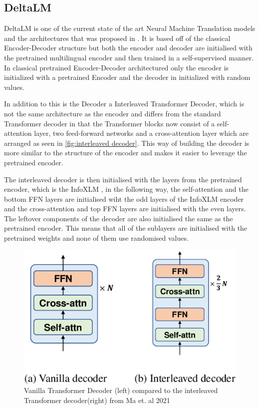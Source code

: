 \subsection{DeltaLM}
DeltaLM is one of the current state of the art Neural Machine Translation models and the architectures that was proposed in \cite{ma2021deltalm}. 
It is based off of the classical Encoder-Decoder structure but both the encoder and decoder are initialised with the pretrained multilingual encoder and then trained in a self-supervised manner. In classical pretrained Encoder-Decoder architectured only the encoder is initialized with a pretrained Encoder and the decoder in initialized with random values.

In addition to this is the Decoder a Interleaved Transformer Decoder, which is not the same architecture as the encoder and differs from the standard Transformer decoder in that the Transformer blocks now consist of a self-attention layer, two feed-forward networks and a cross-attention layer which are arranged as seen in \autoref{fig:interleaved decoder}. 
This way of building the decoder is more similar to the structure of the encoder and makes it easier to leverage the pretrained encoder. 

The interleaved decoder is then initialised with the layers from the pretrained encoder, which is the InfoXLM \cite{chi2021infoxlminformationtheoreticframeworkcrosslingual}, in the following way, the self-attention and the bottom FFN layers are initialised wiht the odd layers of the InfoXLM encoder and the cross-attention and top FFN layers are initialised with the even layers. 
The leftover components of the decoder are also initialised the same as the pretrained encoder. 
This means that all of the sublayers are initialised with the pretrained weights and none of them use randomised values. 

\begin{figure}
    \centering%
    \includegraphics[width=0.5\linewidth]{Latex/sections/images/interleaveddecoder.png}
    \caption{Vanilla Transformer Decoder (left) compared to the interleaved Transformer decoder(right) from Ma et. al 2021}
    \label{fig:interleaved decoder}
\end{figure}



